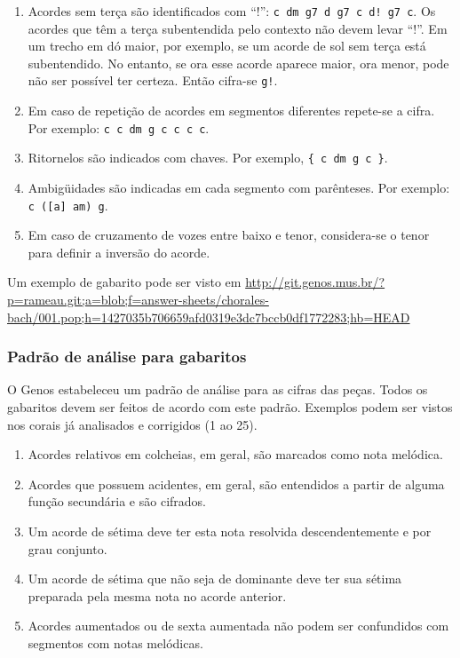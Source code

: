 \documentclass[12pt,brazil]{book}
\begin{document}
\begin{enumerate}
\item Acordes sem terça são identificados com ``!'': \texttt{c dm g7
    d g7 c d!  g7 c}. Os acordes que têm a terça subentendida pelo
  contexto não devem levar ``!''. Em um trecho em dó maior, por
  exemplo, se um acorde de sol sem terça está subentendido. No
  entanto, se ora esse acorde aparece maior, ora menor, pode não ser
  possível ter certeza. Então cifra-se \texttt{g!}.
\item Em caso de repetição de acordes em segmentos diferentes
  repete-se a cifra. Por exemplo: \texttt{c c dm g c c c c}.
\item Ritornelos são indicados com chaves. Por exemplo, \texttt{\{ c
    dm g c \}}.
\item Ambigüidades são indicadas em cada segmento com parênteses. Por
  exemplo: \texttt{c ([a] am) g}.
\item Em caso de cruzamento de vozes entre baixo e tenor, considera-se
  o tenor para definir a inversão do acorde.
\end{enumerate}

Um exemplo de gabarito pode ser visto em
\url{http://git.genos.mus.br/?p=rameau.git;a=blob;f=answer-sheets/chorales-bach/001.pop;h=1427035b706659afd0319e3dc7bccb0df1772283;hb=HEAD}

\subsubsection{Padrão de análise para gabaritos}
\label{sec:padrao-de-analise}

O Genos estabeleceu um padrão de análise para as cifras das
peças. Todos os gabaritos devem ser feitos de acordo com este
padrão. Exemplos podem ser vistos nos corais já analisados e
corrigidos (1 ao 25).

\begin{enumerate}
\item Acordes relativos em colcheias, em geral, são marcados como nota
  melódica.
\item Acordes que possuem acidentes, em geral, são entendidos a partir
  de alguma função secundária e são cifrados.
\item Um acorde de sétima deve ter esta nota resolvida
  descendentemente e por grau conjunto.
\item Um acorde de sétima que não seja de dominante deve ter sua
  sétima preparada pela mesma nota no acorde anterior.
\item Acordes aumentados ou de sexta aumentada não podem ser
  confundidos com segmentos com notas melódicas.
\end{enumerate}
\end{document}
